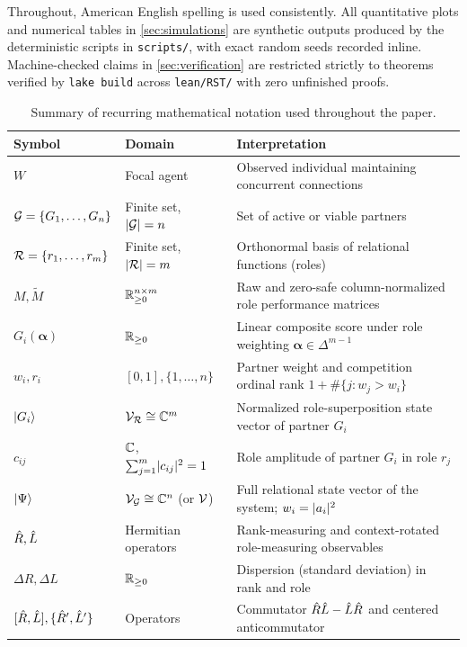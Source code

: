 Throughout, American English spelling is used consistently. All quantitative plots
and numerical tables in \cref{sec:simulations} are synthetic outputs produced by the
deterministic scripts in \texttt{scripts/}, with exact random seeds recorded inline.
Machine-checked claims in \cref{sec:verification} are restricted strictly to theorems
verified by \texttt{lake build} across \texttt{lean/RST/} with zero unfinished proofs.

\begin{table}[htbp]
\centering
\small
\caption{Summary of recurring mathematical notation used throughout the paper.}
\label{tab:notation}
\begin{tabularx}{\textwidth}{@{}llX@{}}
\toprule
Symbol & Domain & Interpretation \\
\midrule
$W$ & Focal agent & Observed individual maintaining concurrent connections \\
$\mathcal{G} = \{G_1, \dots, G_n\}$ & Finite set, $\lvert \mathcal{G} \rvert = n$ & Set of active or viable partners \\
$\mathcal{R} = \{r_1, \dots, r_m\}$ & Finite set, $\lvert \mathcal{R} \rvert = m$ & Orthonormal basis of relational functions (roles) \\
$M, \tilde{M}$ & $\mathbb{R}_{\ge 0}^{n \times m}$ & Raw and zero-safe column-normalized role performance matrices \\
$G_i(\boldsymbol{\alpha})$ & $\mathbb{R}_{\ge 0}$ & Linear composite score under role weighting $\boldsymbol{\alpha} \in \Delta^{m-1}$ \\
$w_i, r_i$ & $[0,1], \{1,\dots,n\}$ & Partner weight and competition ordinal rank $1 + \#\{j : w_j > w_i\}$ \\
$\lvert G_i \rangle$ & $\mathcal{V}_{\mathcal{R}} \cong \mathbb{C}^m$ & Normalized role-superposition state vector of partner $G_i$ \\
$c_{ij}$ & $\mathbb{C}$, $\sum_{j=1}^m \lvert c_{ij} \rvert^2 = 1$ & Role amplitude of partner $G_i$ in role $r_j$ \\
$\lvert \Psi \rangle$ & $\mathcal{V}_{\mathcal{G}} \cong \mathbb{C}^n$ (or $\mathcal{V}$) & Full relational state vector of the system; $w_i = \lvert a_i \rvert^2$ \\
$\hat{R}, \hat{L}$ & Hermitian operators & Rank-measuring and context-rotated role-measuring observables \\
$\Delta R, \Delta L$ & $\mathbb{R}_{\ge 0}$ & Dispersion (standard deviation) in rank and role \\
$[\hat{R}, \hat{L}], \{\hat{R}',\hat{L}'\}$ & Operators & Commutator $\hat{R}\hat{L} - \hat{L}\hat{R}$ and centered anticommutator \\

\end{tabularx}
\end{table}
